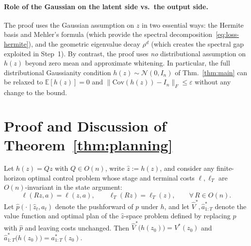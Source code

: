 \paragraph{Role of the Gaussian on the latent side vs.\ the output side.}
The proof uses the Gaussian assumption on $z$ in two essential ways:
the Hermite basis and Mehler's formula (which provide the spectral
decomposition~\eqref{eq:loss-hermite}), and the geometric eigenvalue
decay $\rho^d$ (which creates the spectral gap exploited in
Step~1). By contrast, the proof uses \emph{no} distributional
assumption on $h(z)$ beyond zero mean and approximate whitening.
In particular, the full distributional Gaussianity condition
$h(z) \sim \mathcal{N}(0, I_n)$ of Thm.~\ref{thm:main}
can be relaxed to $\mathbb{E}[h(z)] = 0$ and
$\|\mathrm{Cov}(h(z)) - I_n\|_F \leq \varepsilon$ without
any change to the bound.



\section{Proof and Discussion of Theorem~\ref{thm:planning}}\label{app:planning}

\begin{theoremrestate}
Let $h(z) = Qz$ with $Q \in O(n)$, write $\hat z := h(z)$, and consider any finite-horizon optimal control problem whose stage and terminal costs $\ell, \ell_T$ are $O(n)$-invariant in the state argument:
\begin{equation}\label{eq:orth-inv-app}
    \ell(Rz, a) = \ell(z, a), \qquad \ell_T(Rz) = \ell_T(z), \qquad \forall\, R \in O(n).
\end{equation}
Let $\hat p(\cdot \mid \hat z_t, a_t)$ denote the pushforward of $p$ under $h$, and let $\hat V^*, \hat a^*_{1:T}$ denote the value function and optimal plan of the $\hat z$-space problem defined by replacing $p$ with $\hat p$ and leaving costs unchanged. Then $\hat V^*\!\big(h(z_0)\big) = V^*(z_0)$ and $\hat a^*_{1:T}\!\big(h(z_0)\big) = a^*_{1:T}(z_0)$.
\end{theoremrestate}

